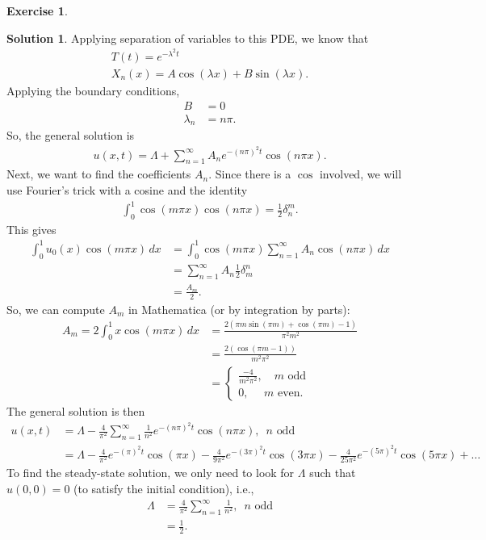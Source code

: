 \documentclass{book}
\theoremstyle{definition}
\newtheorem*{exer*}{Exercise}
\newtheorem*{sln*}{Solution}
\begin{document}
\begin{exer*}
\begin{sln*}
		\noindent Applying separation of variables to this PDE, we know that 
		\begin{align*}
		T(t) = e^{-\lambda^2 t}\\
		X_n(x) = A\cos(\lambda x)  + B\sin(\lambda x).
		\end{align*}
		Applying the boundary conditions, 
		\begin{align*}
		B&= 0\\
		\lambda_n &= n\pi.
		\end{align*}
		So, the general solution is
		\begin{align*}
		u(x,t) = \Lambda + \sum_{n=1}^\infty A_n e^{-(n\pi)^2 t}\cos(n\pi x).
		\end{align*}
		Next, we want to find the coefficients $A_n$. Since there is a $\cos$ involved, we will use Fourier's trick with a cosine and the identity
		\begin{align*}
		\int_{0}^1\cos(m\pi x)\cos(n\pi x) = \frac{1}{2}\delta^m_n.
		\end{align*}
		This gives
		\begin{align*}
		\int_{0}^1 u_0(x)\cos(m\pi x)\,dx &= \int_{0}^1 \cos(m\pi x)\sum_{n=1}^\infty A_n \cos(n\pi x)\,dx\\
		&= \sum_{n=1}^\infty A_n \frac{1}{2}\delta^n_m\\
		&= \frac{A_m}{2}.
		\end{align*}
		So, we can compute $A_m$ in Mathematica (or by integration by parts):
		\begin{align*}
		A_m = 2\int_{0}^1 x\cos(m\pi x)\,dx &= \frac{2 (\pi  m \sin (\pi  m)+\cos (\pi  m)-1)}{\pi ^2 m^2}\\
		&= \frac{2(\cos(\pi m - 1))}{m^2\pi^2}\\
		&= \begin{cases}
		\frac{-4}{m^2\pi^2},\,\,\,\,\,\, m \text{ odd}\\
		0,\,\,\,\,\,\,\,\, m \text{ even}.
		\end{cases}
		\end{align*}
		The general solution is then
		\begin{align*}
		u(x,t) &= \Lambda-\frac{4}{\pi^2}\sum_{n=1}^\infty \frac{1}{n^2}e^{-(n\pi)^2 t}\cos(n\pi x),\,\,\, n \text{ odd}\\
		&= \Lambda-\frac{4}{\pi ^2}e^{-(\pi)^2 t}\cos(\pi x)    -\frac{4}{9 \pi ^2}e^{-(3\pi)^2 t}\cos(3\pi x)        -\frac{4}{25 \pi ^2}e^{-(5\pi)^2 t}\cos(5\pi x) + \dots
		\end{align*}
		To find the steady-state solution, we only need to look for $\Lambda$ such that $u(0,0) = 0$ (to satisfy the initial condition), i.e.,
		\begin{align*}
		\Lambda &= \frac{4}{\pi^2}\sum^\infty_{n=1}\frac{1}{n^2},\,\,\, n \text{ odd}\\
		&= \frac{1}{2}.
		\end{align*}
		

\end{sln*}
\end{exer*}
\end{document}
